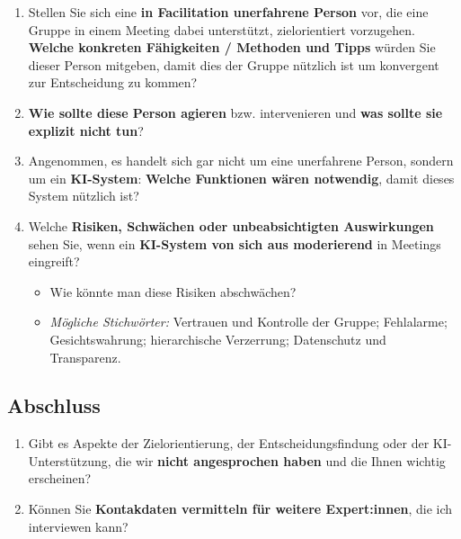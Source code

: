 \begin{enumerate}[label=4.\arabic*, leftmargin=*]
  \item Stellen Sie sich eine \textbf{in Facilitation unerfahrene Person} vor, die eine Gruppe in einem Meeting
    dabei unterstützt, zielorientiert vorzugehen. \textbf{Welche konkreten Fähigkeiten / Methoden und Tipps}
    würden Sie dieser Person mitgeben, damit dies der Gruppe nützlich ist um konvergent zur Entscheidung zu kommen?
  \item \textbf{Wie sollte diese Person agieren} bzw. intervenieren und \textbf{was sollte sie explizit nicht tun}?
  \item Angenommen, es handelt sich gar nicht um eine unerfahrene Person, sondern um ein \textbf{KI-System}:
    \textbf{Welche Funktionen wären notwendig}, damit dieses System nützlich ist?
  \item Welche \textbf{Risiken, Schwächen oder unbeabsichtigten Auswirkungen} sehen Sie, wenn ein
    \textbf{KI-System von sich aus moderierend} in Meetings eingreift?
    \begin{itemize}[label=\textendash]
      \item Wie könnte man diese Risiken abschwächen?
      \item \textit{Mögliche Stichwörter:} Vertrauen und Kontrolle der
        Gruppe; Fehlalarme; Gesichtswahrung; hierarchische Verzerrung; Datenschutz und
        Transparenz.
    \end{itemize}
\end{enumerate}

\subsection*{Abschluss}

\begin{enumerate}[label=5.\arabic*, leftmargin=*]
  \item Gibt es Aspekte der Zielorientierung, der Entscheidungsfindung oder der
    KI-Unterstützung, die wir \textbf{nicht angesprochen haben} und die Ihnen wichtig erscheinen?
  \item Können Sie \textbf{Kontakdaten vermitteln für weitere Expert:innen}, die ich interviewen kann?
\end{enumerate}

\medskip

